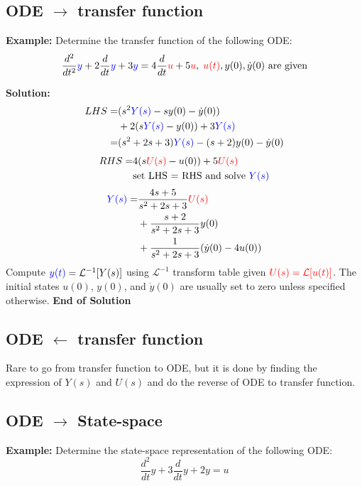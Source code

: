\begin{multicols}{2}
\subsection{ODE $\rightarrow$ transfer function}
\textbf{Example:} 
Determine the transfer function of the following ODE:
\begin{equation*}
    \frac{d^2}{dt^2}{\color{blue}y} +2\frac{d}{dt}{\color{blue}y} +3{\color{blue}y} = 
    4\frac{d}{dt}{\color{red}u} +5{\color{red}u},\; {\color{red}u(t)}, y(0), \dot{y}(0) \text{ are given}
\end{equation*}

\textbf{Solution:}
\begin{align*}
    LHS = &(s^2{\color{blue}Y(s)} - sy(0) - \dot{y}(0))  \\
    &+ 2(s{\color{blue}Y(s)} - y(0)) + 3{\color{blue}Y(s)} \\
    = &(s^2 + 2s + 3){\color{blue}Y(s)} - (s+2)y(0) - \dot{y}(0)
\end{align*}
\begin{align*}
    RHS = &4(s{\color{red}U(s)} - u(0)) + 5{\color{red}U(s)} \\
    &\text{set LHS = RHS and solve } {\color{blue}Y(s)}
\end{align*}
\begin{align*}
    {\color{blue}Y(s)} = &\frac{4s+5}{s^2+2s+3}{\color{red}U(s)} \\
    &+ \frac{s+2}{s^2+2s+3}y(0) \\
    &+ \frac{1}{s^2+2s+3}(\dot{y}(0) - 4u(0))
\end{align*}
Compute ${\color{blue}y(t)} = \mathcal{L}^{-1}[Y(s)]$ using $\mathcal{L}^{-1}$ transform table 
given $\color{red}U(s) = \mathcal{L}[u(t)]$. The initial states $u(0)$, $y(0)$, and $\dot{y}(0)$
are usually set to zero unless specified otherwise.\newline
\textbf{End of Solution}


\subsection{ODE $\leftarrow$ transfer function}
Rare to go from transfer function to ODE, but it is done by 
finding the expression of $Y(s)$ and $U(s)$ and do the reverse 
of ODE to transfer function.


\subsection{ODE $\rightarrow$ State-space}
\textbf{Example:}
Determine the state-space representation of the following ODE:
\begin{equation*}
    \frac{d^2}{dt}y + 3\frac{d}{dt}y + 2y = u
\end{equation*}


\end{multicols}
